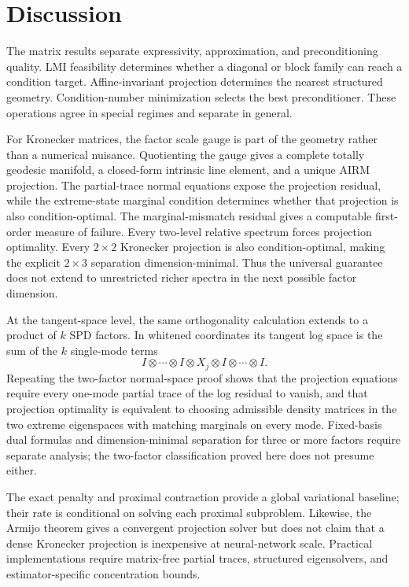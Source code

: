 \section{Discussion}
\label{sec:discussion}

The matrix results separate expressivity, approximation, and
preconditioning quality.  LMI feasibility determines whether a diagonal or
block family can reach a condition target.  Affine-invariant projection
determines the nearest structured geometry.  Condition-number minimization
selects the best preconditioner.  These operations agree in special regimes
and separate in general.

For Kronecker matrices, the factor scale gauge is part of the geometry rather
than a numerical nuisance.  Quotienting the gauge gives a complete totally
geodesic manifold, a closed-form intrinsic line element, and a unique AIRM
projection.  The partial-trace normal equations expose the projection
residual, while the extreme-state marginal condition determines whether that
projection is also condition-optimal.  The marginal-mismatch residual gives a
computable first-order measure of failure.  Every two-level relative spectrum
forces projection optimality.  Every \(2\times2\) Kronecker projection is also
condition-optimal, making the explicit \(2\times3\) separation
dimension-minimal.  Thus the universal guarantee does not extend to
unrestricted richer spectra in the next possible factor dimension.

At the tangent-space level, the same orthogonality calculation extends to a
product of \(k\) SPD factors.  In whitened coordinates its tangent log space
is the sum of the \(k\)
single-mode terms
\[
  I\otimes\cdots\otimes I\otimes X_j\otimes I\otimes\cdots\otimes I.
\]
Repeating the two-factor normal-space proof shows that the projection equations
require every one-mode partial trace of the log residual to vanish, and that
projection optimality is equivalent to choosing admissible density matrices
in the two extreme eigenspaces with matching marginals on every mode.
Fixed-basis dual formulas
and dimension-minimal separation for three or more factors require separate
analysis; the two-factor classification proved here does not presume either.

The exact penalty and proximal contraction provide a global variational
baseline; their rate is conditional on solving each proximal subproblem.
Likewise, the Armijo theorem gives a convergent projection solver but does not
claim that a dense Kronecker projection is inexpensive at neural-network
scale.  Practical implementations require matrix-free partial traces,
structured eigensolvers, and estimator-specific concentration bounds.


